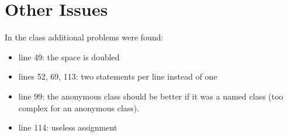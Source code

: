 \documentclass{article}
\begin{document}
	\section{Other Issues}
		In the class additional problems were found:
		\begin{itemize}
			\item line 49: the space is doubled
			\item lines 52, 69, 113: two statements per line instead of one \\
			
			\begin{minipage}{\linewidth}
				\vspace{2mm}
				\vspace{2mm}
			\end{minipage}
			\item line 99: the anonymous class should be better if it was a named class (too complex for an anonymous class). \\
			
			\begin{minipage}{\linewidth}
				\vspace{2mm}
				\vspace{2mm}
			\end{minipage}
			\item line 114: useless assignment \\
			
			\begin{minipage}{\linewidth}
				\vspace{2mm}
				\vspace{2mm}
			\end{minipage}
		\end{itemize}
		\pagebreak
\end{document}
